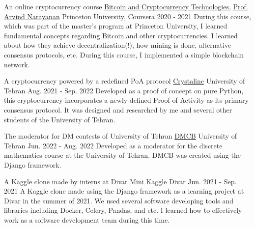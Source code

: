 



\begin{cventries}

  \cventry
    {An online cryptocurrency course} %
    { \href{https://www.coursera.org/learn/cryptocurrency}{Bitcoin and Cryptocurrency Technologies}, \href{https://www.coursera.org/instructor/anarayanan}{Prof. Arvind Narayanan} } %
    {Princeton University, Coursera} %
    {2020 - 2021} %
    {
      During this course, which was part of the master's program at Princeton University, I learned fundamental concepts regarding Bitcoin and other cryptocurrencies. I learned about how they achieve decentralization(!), how mining is done, alternative consensus protocols, etc. During this course, I implemented a simple blockchain network. 
    }

  \cventry
    {A cryptocurrency powered by a redefined PoA protocol} %
    { \href{https://github.com/Crystaline-Coin/crystaline}{Crystaline} } %
    {University of Tehran} %
    {Aug. 2021 - Sep. 2022} %
    {
      Developed as a proof of concept on pure Python, this cryptocurrency incorporates a newly defined Proof of Activity as its primary consensus protocol. It was designed and researched by me and several other students of the University of Tehran.
    }

  \cventry
    {The moderator for DM contests of University of Tehran} %
    {\href{https://github.com/kamali-sina/dmcb}{DMCB}} %
    {University of Tehran} %
    {Jun. 2022 - Aug. 2022} %
    {
      Developed as a moderator for the discrete mathematics course at the University of Tehran. DMCB was created using the Django framework. 
      }

  \cventry
    {A Kaggle clone made by interns at Divar} %
    {\href{https://github.com/kamali-sina/mini-kaggle}{Mini Kaggle}} %
    {Divar} %
    {Jun. 2021 - Sep. 2021} %
    {
      A Kaggle clone made using the Django framework as a learning project at Divar in the summer of 2021. We used several software developing tools and libraries including Docker, Celery, Pandas, and etc. I learned how to effectively work as a software development team during this time.
    }


\end{cventries}
